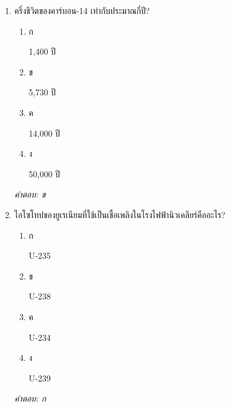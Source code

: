 \documentclass[12pt]{article}
\begin{document}
\begin{enumerate}[label=\arabic*., itemsep=0.5\baselineskip, topsep=0.5\baselineskip, leftmargin=*]
\item ครึ่งชีวิตของคาร์บอน-14 เท่ากับประมาณกี่ปี?
\begin{enumerate}[label=\alph*)., itemsep=0.3\baselineskip, topsep=0.3\baselineskip]
\item ก\ 
\begin{minipage}[t]{0.9\linewidth}
\raggedright 1,400 ปี
\end{minipage}
\item ข\ 
\begin{minipage}[t]{0.9\linewidth}
\raggedright 5,730 ปี
\end{minipage}
\item ค\ 
\begin{minipage}[t]{0.9\linewidth}
\raggedright 14,000 ปี
\end{minipage}
\item ง\ 
\begin{minipage}[t]{0.9\linewidth}
\raggedright 50,000 ปี
\end{minipage}
\end{enumerate}
\vspace{-0.3\baselineskip}
\begin{small}
\textit{คำตอบ: ข}
\end{small}

\item ไอโซโทปของยูเรเนียมที่ใช้เป็นเชื้อเพลิงในโรงไฟฟ้านิวเคลียร์คืออะไร?
\begin{enumerate}[label=\alph*)., itemsep=0.3\baselineskip, topsep=0.3\baselineskip]
\item ก\ 
\begin{minipage}[t]{0.9\linewidth}
\raggedright U-235
\end{minipage}
\item ข\ 
\begin{minipage}[t]{0.9\linewidth}
\raggedright U-238
\end{minipage}
\item ค\ 
\begin{minipage}[t]{0.9\linewidth}
\raggedright U-234
\end{minipage}
\item ง\ 
\begin{minipage}[t]{0.9\linewidth}
\raggedright U-239
\end{minipage}
\end{enumerate}
\vspace{-0.3\baselineskip}
\begin{small}
\textit{คำตอบ: ก}
\end{small}


\end{enumerate}
\end{document}
